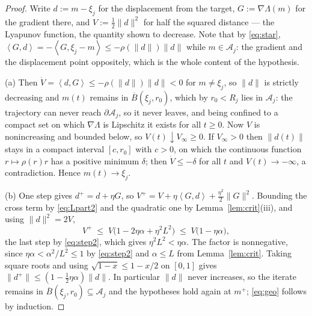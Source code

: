 \documentclass[11pt]{article}
\theoremstyle{definition}
\newcommand{\cA}{\mathcal{A}}
\newcommand{\ip}[2]{\left\langle #1, #2 \right\rangle}
\begin{document}
\begin{proof}
Write $d := m - \xi_j$ for the displacement from the target, $G :=
\nabla\Lambda(m)$ for the gradient there, and $V := \tfrac12\|d\|^2$ for half the
squared distance --- the Lyapunov function, the quantity shown to decrease. Note
that by \eqref{eq:star}, $\ip{G}{d} = -\ip{G}{\xi_j - m} \le -\rho(\|d\|)\|d\|$
while $m \in \cA_j$: the gradient and the displacement point oppositely, which is
the whole content of the hypothesis.

(a) Then $\dot V = \ip{d}{G} \le -\rho(\|d\|)\|d\| < 0$ for $m \ne \xi_j$, so
$\|d\|$ is strictly decreasing and $m(t)$ remains in $\overline{B}(\xi_j, r_0)$,
which by $r_0 < R_j$ lies in $\cA_j$: the trajectory can never reach
$\partial\cA_j$, so it never leaves, and being confined to a compact set on which
$\nabla\Lambda$ is Lipschitz it exists for all $t \ge 0$. Now $V$ is
nonincreasing and bounded below, so $V(t) \downarrow V_\infty \ge 0$. If
$V_\infty > 0$ then $\|d(t)\|$ stays in a compact interval $[c, r_0]$ with
$c > 0$, on which the continuous function $r \mapsto \rho(r)r$ has a positive
minimum $\delta$; then $\dot V \le -\delta$ for all $t$ and $V(t) \to -\infty$, a
contradiction. Hence $m(t) \to \xi_j$.

(b) One step gives $d^+ = d + \eta G$, so
$V^+ = V + \eta\ip{G}{d} + \tfrac{\eta^2}{2}\|G\|^2$. Bounding the cross term by
\eqref{eq:Lpart2} and the quadratic one by Lemma~\ref{lem:crit}(iii), and using
$\|d\|^2 = 2V$,
\[
  V^+ \;\le\; V\big(1 - 2\eta\alpha + \eta^2L^2\big)
  \;\le\; V\big(1 - \eta\alpha\big),
\]
the last step by \eqref{eq:step2}, which gives $\eta^2L^2 < \eta\alpha$. The
factor is nonnegative, since $\eta\alpha < \alpha^2/L^2 \le 1$ by
\eqref{eq:step2} and $\alpha \le L$ from Lemma~\ref{lem:crit}. Taking square
roots and using $\sqrt{1-x} \le 1 - x/2$ on $[0,1]$ gives
$\|d^+\| \le (1 - \tfrac12\eta\alpha)\|d\|$. In particular $\|d\|$ never
increases, so the iterate remains in $\overline{B}(\xi_j,r_0) \subseteq \cA_j$
and the hypotheses hold again at $m^+$; \eqref{eq:geo} follows by induction.
\end{proof}
\end{document}
